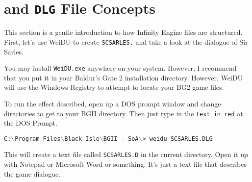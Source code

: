 \documentclass{article}
\def\ttref#1{\ahrefloc{#1}{\tt #1}}
\def\DEFINE#1{{\tt \bf #1}\label{#1}\index{#1}}
\def\t#1{{\tt #1}}
\def\CMD#1{{\tt {C:$\backslash$Program Files$\backslash$Black Isle$\backslash$BGII - SoA$\backslash$>} \color{red} \t{#1} }}
\begin{document}
\section{\ttref{D} and \DEFINE{DLG} File Concepts}

This section is a gentle introduction to how Infinity Engine \ttref{DLG}
files are structured. First, let's use WeiDU to create
\t{SCSARLES.}\ttref{D} and take a look at the dialogue of Sir Sarles.

You may install \t{WeiDU.exe} anywhere on your system. However, I recommend
that you put it in your Baldur's Gate 2 installation directory.  However,
WeiDU will use the Windows Registry to attempt to locate your BG2 game
files.

To run the effect described, open up a DOS prompt window and change
directories to get to your BGII directory. Then just type in the
{\color{red} \tt text in red} at the DOS Prompt.

\CMD{weidu SCSARLES.DLG}

This will create a text file called \t{SCSARLES.D} in the current
directory.  Open it up with Notepad or Microsoft Word or something. It's
just a text file that describes the game dialogue.
\end{document}
